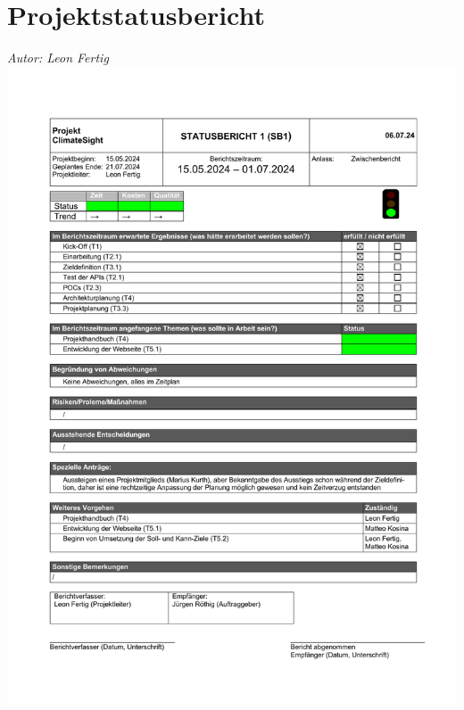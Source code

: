 \documentclass[12pt]{article}
\begin{document}
\section{Projektstatusbericht}
{\it Autor: Leon Fertig}
\newline
\includegraphics[width=\textwidth]{Planungsdokumente/graphics/Projektstatusbericht.pdf}
\end{document}
